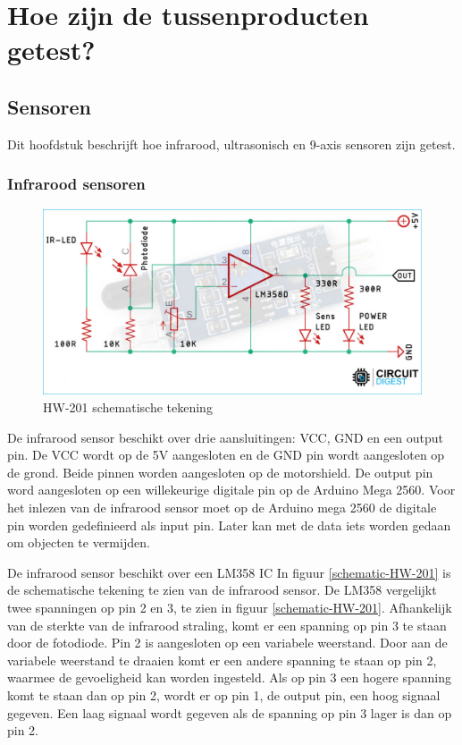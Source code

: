 \section{Hoe zijn de tussenproducten getest?}
\subsection{Sensoren}
Dit hoofdstuk beschrijft hoe infrarood, ultrasonisch en 9-axis sensoren zijn getest.
\subsubsection{Infrarood sensoren}
\begin{figure}[h]
    \centering
    \includegraphics[scale = 0.3]{Media/Figuren/Arduino-IR-Sensor-Circuit.jpg}
    \caption{HW-201 schematische tekening}
    \label{schematic-HW-201}   
    \end{figure}
De infrarood sensor beschikt over drie aansluitingen: VCC, GND en een output pin. De VCC wordt op de 5V aangesloten en de GND pin wordt aangesloten op de grond. Beide pinnen worden aangesloten op de motorshield. De output pin word aangesloten op een willekeurige digitale pin op de Arduino Mega 2560. Voor het inlezen van de infrarood sensor moet op de Arduino mega 2560 de digitale pin worden gedefinieerd als input pin. Later kan met de data iets worden gedaan om objecten te vermijden.

De infrarood sensor beschikt over een LM358 IC\cite{LM358-datasheet} In figuur \eqref{schematic-HW-201}\cite{HW-201-schema} is de schematische tekening te zien van de infrarood sensor. De LM358 vergelijkt twee spanningen op pin 2 en 3, te zien in figuur \eqref{schematic-HW-201}. Afhankelijk van de sterkte van de infrarood straling, komt er een spanning op pin 3 te staan door de fotodiode. Pin 2 is aangesloten op een variabele weerstand. Door aan de variabele weerstand te draaien komt er een andere spanning te staan op pin 2, waarmee de gevoeligheid kan worden ingesteld. Als op pin 3 een hogere spanning komt te staan dan op pin 2, wordt er op pin 1, de output pin, een hoog signaal gegeven. Een laag signaal wordt gegeven als de spanning op pin 3 lager is dan op pin 2.

